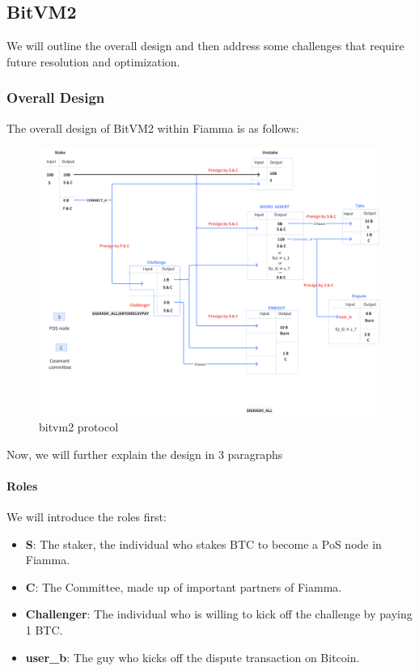 \subsection{BitVM2}

We will outline the overall design and then address some challenges that require future resolution and optimization.

\subsubsection{Overall Design}

The overall design of BitVM2 within Fiamma is as follows:

\begin{figure}[ht] 
    \centering  
    \includegraphics[width=0.85\columnwidth]{images/bitvm2 protocol.png} 
    \caption{bitvm2 protocol}
    \label{fig:bitvm2 protocol}
\end{figure}

Now, we will further explain the design in 3 paragraphs

\paragraph{Roles}

We will introduce the roles first:

\begin{itemize}
    \item \textbf{S}: The staker, the individual who stakes BTC to become a PoS node in Fiamma.
    \item \textbf{C}: The Committee, made up of important partners of Fiamma.
    \item \textbf{Challenger}: The individual who is willing to kick off the challenge by paying 1 BTC.
    \item \textbf{user\_b}: The guy who kicks off the dispute transaction on Bitcoin.
\end{itemize}

